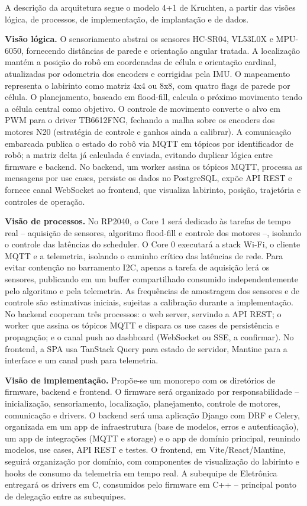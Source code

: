     A descrição da arquitetura segue o modelo 4+1 de Kruchten, a partir das visões lógica, de processos, de implementação, de implantação e de dados.

    \textbf{Visão lógica.} O sensoriamento abstrai os sensores HC-SR04, VL53L0X e MPU-6050, fornecendo distâncias de parede e orientação angular tratada. A localização mantém a posição do robô em coordenadas de célula e orientação cardinal, atualizadas por odometria dos encoders e corrigidas pela IMU. O mapeamento representa o labirinto como matriz 4x4 ou 8x8, com quatro flags de parede por célula. O planejamento, baseado em flood-fill, calcula o próximo movimento tendo a célula central como objetivo. O controle de movimento converte o alvo em PWM para o driver TB6612FNG, fechando a malha sobre os encoders dos motores N20 (estratégia de controle e ganhos ainda a calibrar). A comunicação embarcada publica o estado do robô via MQTT em tópicos por identificador de robô; a matriz delta já calculada é enviada, evitando duplicar lógica entre firmware e backend. No backend, um worker assina os tópicos MQTT, processa as mensagens por use cases, persiste os dados no PostgreSQL, expõe API REST e fornece canal WebSocket ao frontend, que visualiza labirinto, posição, trajetória e controles de operação.

    \textbf{Visão de processos.} No RP2040, o Core 1 será dedicado às tarefas de tempo real -- aquisição de sensores, algoritmo flood-fill e controle dos motores --, isolando o controle das latências do scheduler. O Core 0 executará a stack Wi-Fi, o cliente MQTT e a telemetria, isolando o caminho crítico das latências de rede. Para evitar contenção no barramento I2C, apenas a tarefa de aquisição lerá os sensores, publicando em um buffer compartilhado consumido independentemente pelo algoritmo e pela telemetria. As frequências de amostragem dos sensores e de controle são estimativas iniciais, sujeitas a calibração durante a implementação. No backend cooperam três processos: o web server, servindo a API REST; o worker que assina os tópicos MQTT e dispara os use cases de persistência e propagação; e o canal push ao dashboard (WebSocket ou SSE, a confirmar). No frontend, a SPA usa TanStack Query para estado de servidor, Mantine para a interface e um canal push para telemetria.

    \textbf{Visão de implementação.} Propõe-se um monorepo com os diretórios de firmware, backend e frontend. O firmware será organizado por responsabilidade -- inicialização, sensoriamento, localização, planejamento, controle de motores, comunicação e drivers. O backend será uma aplicação Django com DRF e Celery, organizada em um app de infraestrutura (base de modelos, erros e autenticação), um app de integrações (MQTT e storage) e o app de domínio principal, reunindo modelos, use cases, API REST e testes. O frontend, em Vite/React/Mantine, seguirá organização por domínio, com componentes de visualização do labirinto e hooks de consumo da telemetria em tempo real. A subequipe de Eletrônica entregará os drivers em C, consumidos pelo firmware em C++ -- principal ponto de delegação entre as subequipes.

